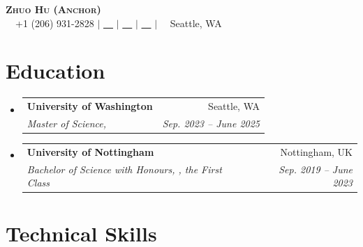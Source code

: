 \documentclass[a4paper,11pt]{article}
\makeatletter
\newcommand{\link}[1]{\color{myBlue}{#1}}
\newcommand{\resumeSubheading}[4]{
  \vspace{-2pt}\item
    \begin{tabular*}{0.97\textwidth}[t]{l@{\extracolsep{\fill}}r}
      \textbf{#1} & #2 \\
      \textit{\small#3} & \textit{\small #4} \\
    \end{tabular*}\vspace{-7pt}
}
\newcommand{\resumeSubHeadingListStart}{\begin{itemize}[leftmargin=0.15in, label={}]}
\newcommand{\resumeSubHeadingListEnd}{\end{itemize}}
\makeatother
\begin{document}

\begin{center}
    \textbf{\Huge \scshape Zhuo Hu (Anchor)} \\ \vspace{1pt}
    \small \faMobile \ \ +1 (206) 931-2828 $|$ \href{mailto:uwzhuohu@uw.edu}{\faEnvelope \ \ \link{uwzhuohu@uw.edu}} $|$ 
    \href{https://linkedin.com/in/zhuo-hu}{\faLinkedin \ \ \link{LinkedIn}} $|$
    \href{https://github.com/Anchor-ZhuoHU}{\faGithub \ \ \link{GitHub}} $|$
    \faBuilding \ \ Seattle, WA
\end{center}


\section{Education}
  \resumeSubHeadingListStart
  
    \resumeSubheading
      {University of Washington}{Seattle, WA}
      {Master of Science, \href{https://www.ece.uw.edu/}{\link{Electrical and Computer Engineering}}}{Sep. 2023 -- June 2025}
      
    \resumeSubheading
      {University of Nottingham}{Nottingham, UK}
      {Bachelor of Science with Honours, \href{https://www.nottingham.ac.uk/mathematics/}{\link{Mathematics with Applied Mathematics}}, the First Class}{Sep. 2019 -- June 2023}
      
  \resumeSubHeadingListEnd

\section{Technical Skills}
\end{document}
